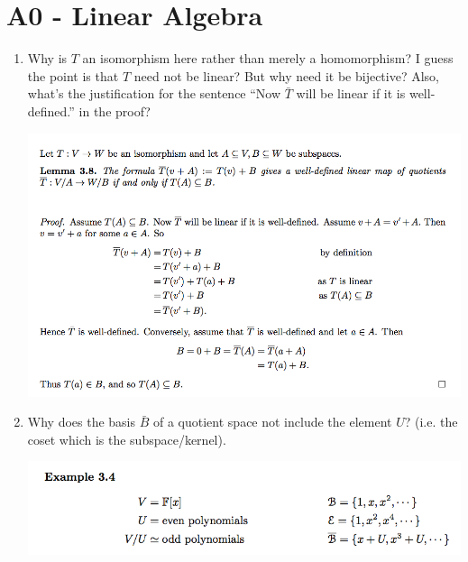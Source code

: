 \documentclass[12pt]{article}
\begin{document}
\section{A0 - Linear Algebra}
\begin{enumerate}
\item Why is $T$ an isomorphism here rather than merely a homomorphism? I guess the point is that
  $T$ need not be linear? But why need it be bijective? Also, what's the justification for the
  sentence ``Now $\bar T$ will be linear if it is well-defined.'' in the proof?
  \begin{mdframed}
    \includegraphics[width=400pt]{img/question-linear-algebra-a0-induced-map-well-defined-theorem.png}
  \end{mdframed}
\item Why does the basis $\bar B$ of a quotient space not include the element $U$? (i.e. the coset
  which is the subspace/kernel). 
  \begin{mdframed}
    \includegraphics[width=400pt]{img/question-linear-algebra-a0-basis-of-quotient-space.png}
  \end{mdframed}
\end{enumerate}
\end{document}
